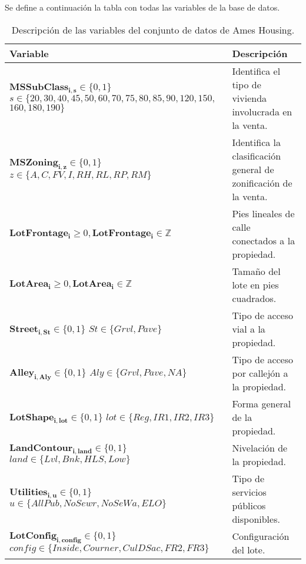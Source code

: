 Se define a continuación la tabla con todas las variables de la base de datos.
\begin{longtable}{ | p{8cm} | p{5cm} | }
    \caption{Descripción de las variables del conjunto de datos de Ames Housing.} \label{tab:variables_ames} \\
    \hline
    \textbf{Variable} & \textbf{Descripción}\\
    \hline
    $\boldsymbol{MSSubClass_{i, s}} \in \{0, 1\}$ \newline $s \in \{20, 30, 40, 45, 50, 60, 70, 75, 80, 85, 90, 120, 150,$\newline \hspace{1cm}$160, 180, 190\}$ & Identifica el tipo de vivienda involucrada en la venta.\\
    \hline
    $\boldsymbol{MSZoning_{i, z}} \in \{0,1\}$ \newline
    $z \in \{A, C, FV, I, RH, RL, RP, RM\}$ & Identifica la clasificación general de zonificación de la venta.\\
    \hline
    $\boldsymbol{LotFrontage_{i}} \geq 0, \boldsymbol{LotFrontage_{i}} \in \mathbb{Z}$ & Pies lineales de calle conectados a la propiedad.\\
    \hline
    $\boldsymbol{LotArea_{i}} \geq 0, \boldsymbol{LotArea_{i}} \in \mathbb{Z}$ & Tamaño del lote en pies cuadrados.\\
    \hline
    $\boldsymbol{Street_{i, St}} \in \{0, 1\}$ \newline $St \in \{Grvl, Pave\}$ & Tipo de acceso vial a la propiedad.\\
    \hline
    $\boldsymbol{Alley_{i, Aly}} \in \{0, 1\}$ \newline $Aly \in \{Grvl, Pave, NA\}$ & Tipo de acceso por callejón a la propiedad.\\
    \hline
    $\boldsymbol{LotShape_{i, lot}} \in \{0, 1\}$ \newline $lot \in \{Reg, IR1, IR2, IR3\}$ & Forma general de la propiedad.\\
    \hline
    $\boldsymbol{LandContour_{i, land}} \in \{0, 1\}$ \newline $land \in \{Lvl, Bnk, HLS, Low\}$ & Nivelación de la propiedad.\\
    \hline
    $\boldsymbol{Utilities_{i,u}} \in \{0, 1\}$ \newline 
    $u \in \{AllPub, NoSewr, NoSeWa, ELO\}$ & Tipo de servicios públicos disponibles.\\
    \hline
    $\boldsymbol{LotConfig_{i, config}} \in \{0, 1\}$ \newline $config \in \{Inside, Courner, CulDSac, FR2, FR3\}$ & Configuración del lote.\\

\end{longtable}
